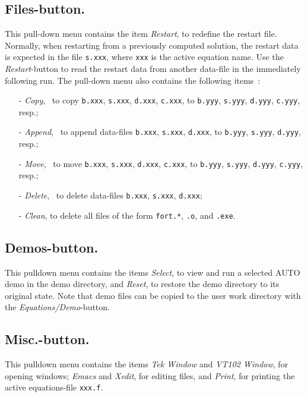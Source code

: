 \documentclass[12pt]{report}
\begin{document}
\subsection{ Files-button.}
This pull-down menu contains 
the item 
{\it Restart}, to redefine the restart file.
Normally, when restarting from a previously computed solution,
the restart data is expected in the file {\tt s.xxx},
where {\tt xxx} is the active equation name.
Use the {\it Restart}-button to read the restart data from another data-file
in the immediately following run.  
The pull-down menu also contains the following items~:
\begin{itemize}
\item[-]{\it Copy},~ to copy  
  {\tt b.xxx}, {\tt s.xxx}, {\tt d.xxx}, {\tt c.xxx},
  to
  {\tt b.yyy}, {\tt s.yyy}, {\tt d.yyy}, {\tt c.yyy}, resp.;

\item[-]{\it Append},~ to append data-files
  {\tt b.xxx}, {\tt s.xxx}, {\tt d.xxx},
  to
  {\tt b.yyy}, {\tt s.yyy}, {\tt d.yyy}, resp.;

\item[-]{\it Move},~ to move 
  {\tt b.xxx}, {\tt s.xxx}, {\tt d.xxx}, {\tt c.xxx},
  to
  {\tt b.yyy}, {\tt s.yyy}, {\tt d.yyy}, {\tt c.yyy}, resp.;

\item[-]{\it Delete},~ to delete data-files
  {\tt b.xxx}, {\tt s.xxx}, {\tt d.xxx};  

\item[-]{\it Clean}, to delete all files of the form 
  {\tt fort.*}, {\tt *.o}, and {\tt *.exe}.  
\end{itemize}


\subsection{ Demos-button.}
This pulldown menu contains the items
{\it Select},
to view and run a selected {\cal AUTO} demo in the demo directory,
and
{\it Reset},
to restore the demo directory to its original state.
Note that demo files can be copied to the user work directory
with the {\it Equations/Demo}-button.


\subsection{ Misc.-button.}
This pulldown menu contains the items
{\it Tek Window}
and
{\it VT102 Window},
for opening windows;
{\it Emacs}
and
{\it Xedit},
for editing files,
and
{\it Print}, for printing the active equations-file {\tt xxx.f}.
\end{document}
